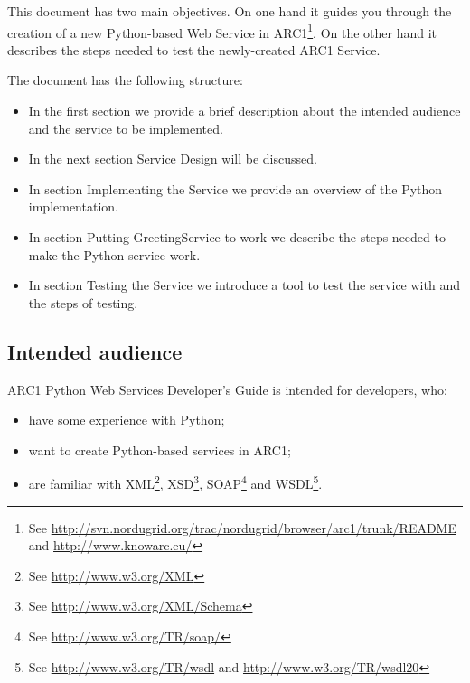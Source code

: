 \documentclass{article}
\begin{document}
This document has two main objectives. On one hand it guides you through the
creation of a new Python-based Web Service in ARC1\footnote[1]{See
  \url{http://svn.nordugrid.org/trac/nordugrid/browser/arc1/trunk/README}
  and \url{http://www.knowarc.eu/}}. On the other hand it describes the steps
needed to test the newly-created ARC1 Service.

The document has the following structure:

\begin{itemize}

  \item{In the first section we provide a brief description about the
    intended audience and the service to be implemented.}

  \item{In the next section Service Design will be discussed.}

  \item{In section Implementing the Service we provide an overview of the
    Python implementation.}

  \item{In section Putting GreetingService to work we describe the steps
    needed to make the Python service work.}

  \item{In section Testing the Service we introduce a tool to test the
    service with and the steps of testing.}

\end{itemize}

\subsection{Intended audience}

ARC1 Python Web Services Developer's Guide is intended for developers, who:

\begin{itemize}

  \item{have some experience with Python;}
  \item{want to create Python-based services in ARC1;}
  \item{are familiar with XML\footnote{See
      \url{http://www.w3.org/XML}}, XSD\footnote{See
      \url{http://www.w3.org/XML/Schema}}, SOAP\footnote{See
      \url{http://www.w3.org/TR/soap/}} and WSDL\footnote{See
      \url{http://www.w3.org/TR/wsdl} and
      \url{http://www.w3.org/TR/wsdl20}}.}

\end{itemize}
\end{document}
